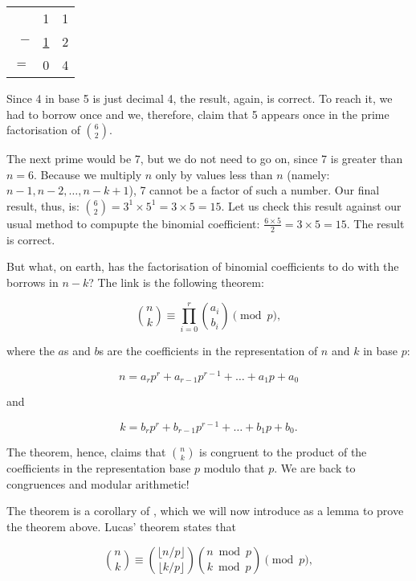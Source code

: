 \documentclass[tikz]{scrreprt}
\begin{document}
\begin{tabular}{r r r}
    & 1             & 1 \\
$-$ & \underline{1} & 2 \\
$=$ & 0             & 4 
\end{tabular}

Since 4 in base 5 is just decimal 4,
the result, again, is correct.
To reach it, we had to borrow once
and we, therefore, claim that 5
appears once in the prime factorisation of
$\binom{6}{2}$.

The next prime would be 7,
but we do not need to go on,
since 7 is greater than $n=6$.
Because we multiply $n$ only by values
less than $n$ (namely: $n-1,n-2,\dots,n-k+1$),
7 cannot be a factor of such a number.
Our final result, thus, is:
$\binom{6}{2} = 3^1 \times 5^1 = 3 \times 5 = 15$.
Let us check this result against our usual method
to compupte the binomial coefficient:
$\frac{6 \times 5}{2} = 3 \times 5 = 15$.
The result is correct.

But what, on earth, has the factorisation
of binomial coefficients to do with 
the borrows in $n-k$? 
The link is the following theorem:

\begin{equation}
\binom{n}{k} \equiv \prod_{i=0}^{r}{\binom{a_i}{b_i}} \pmod{p},
\end{equation}

where the $a$s and $b$s are the coefficients
in the representation of $n$ and $k$ 
in base $p$:

\begin{equation}
n = a_rp^r + a_{r-1}p^{r-1} + \dots + a_1p + a_0
\end{equation}

and

\begin{equation}
k = b_rp^r + b_{r-1}p^{r-1} + \dots + b_1p + b_0.
\end{equation}

The theorem, hence, claims that
$\binom{n}{k}$ is congruent
to the product of the coefficients
in the representation base $p$ 
modulo that $p$.
We are back to congruences and
modular arithmetic!

The theorem is a corollary of ,
which we will now introduce as a lemma to prove
the theorem above.
Lucas' theorem states that

\begin{equation}\label{eq:lucas1}
\binom{n}{k} \equiv \binom{\lfloor n/p\rfloor}{\lfloor k/p\rfloor}
                    \binom{n \bmod p}{k \bmod p} \pmod{p},
\end{equation}
\end{document}
